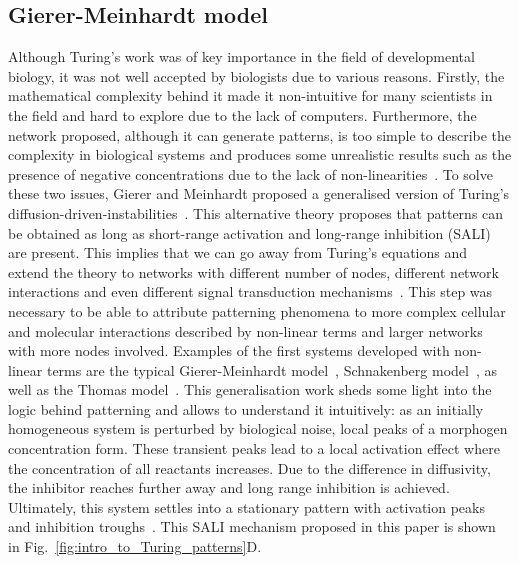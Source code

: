 \subsection{Gierer-Meinhardt model}
Although Turing’s work was of key importance in the field of developmental biology, it was not well accepted by biologists due to various reasons.
Firstly, the mathematical complexity behind it made it non-intuitive for many scientists in the field and hard to explore due to the lack of computers.
Furthermore, the network proposed, although it can generate patterns, is too simple to describe the complexity in biological systems and produces some unrealistic results such as the presence of negative concentrations due to the lack of non-linearities~\parencite{Kondo2010a}.
To solve these two issues, Gierer and Meinhardt proposed a generalised version of Turing’s diffusion-driven-instabilities~\parencite{Gierer1972}.
This alternative theory proposes that patterns can be obtained as long as short-range activation and long-range inhibition (SALI) are present.
This implies that we can go away from Turing’s equations and extend the theory to networks with different number of nodes, different network interactions and even different signal transduction mechanisms~\parencite{Murray1983, Rauch2004, Swindale1980}.
This step was necessary to be able to attribute patterning phenomena to more complex cellular and molecular interactions described by non-linear terms and larger networks with more nodes involved.
Examples of the first systems developed with non-linear terms are the typical Gierer-Meinhardt model~\parencite{Gierer1972}, Schnakenberg model~\parencite{Schnakenberg1979}, as well as the Thomas model~\parencite{thomas1976analysis}.
This generalisation work sheds some light into the logic behind patterning and allows to understand it intuitively: as an initially homogeneous system is perturbed by biological noise, local peaks of a morphogen concentration form.
These transient peaks lead to a local activation effect where the concentration of all reactants increases.
Due to the difference in diffusivity, the inhibitor reaches further away and long range inhibition is achieved.
Ultimately, this system settles into a stationary pattern with activation peaks and inhibition troughs~\parencite{Gierer1972}.
This SALI mechanism proposed in this paper is shown in Fig.~\ref{fig:intro_to_Turing_patterns}D.
